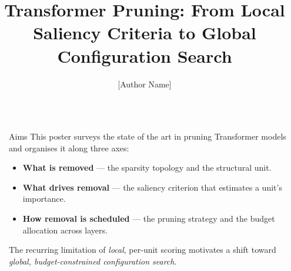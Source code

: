\documentclass[final]{beamer}
\title{Transformer Pruning: From Local Saliency Criteria to Global Configuration Search}
\author{[Author Name]}
\institute{[University / Department] \\[0.5ex] Supervisor: [Supervisor Name]}
\newlength{\sepwid}
\newlength{\onecolwid}
\begin{document}
\setlength{\belowcaptionskip}{2ex}
\setlength\belowdisplayshortskip{2ex}

\begin{frame}[t]
\begin{columns}[t]

\begin{column}{\sepwid}\end{column} %

\begin{column}{\onecolwid}

\begin{alertblock}{Aims}
This poster surveys the state of the art in pruning Transformer models and
organises it along three axes:
\begin{itemize}
\item \textbf{What is removed} --- the sparsity topology and the structural unit.
\item \textbf{What drives removal} --- the saliency criterion that estimates a unit's importance.
\item \textbf{How removal is scheduled} --- the pruning strategy and the budget allocation across layers.
\end{itemize}
The recurring limitation of \emph{local}, per-unit scoring motivates a shift
toward \emph{global, budget-constrained configuration search}.
\end{alertblock}


\end{column}
\end{columns}
\end{frame}
\end{document}
